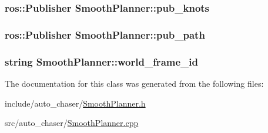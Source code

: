\subsubsection[{\texorpdfstring{pub\+\_\+knots}{pub_knots}}]{\setlength{\rightskip}{0pt plus 5cm}ros\+::\+Publisher Smooth\+Planner\+::pub\+\_\+knots}\hypertarget{class_smooth_planner_a7ee67bceac6d60409542a2250b2ccd08}{}\label{class_smooth_planner_a7ee67bceac6d60409542a2250b2ccd08}
\subsubsection[{\texorpdfstring{pub\+\_\+path}{pub_path}}]{\setlength{\rightskip}{0pt plus 5cm}ros\+::\+Publisher Smooth\+Planner\+::pub\+\_\+path}\hypertarget{class_smooth_planner_a7b8400f711456291e567d0fc204c274b}{}\label{class_smooth_planner_a7b8400f711456291e567d0fc204c274b}
\subsubsection[{\texorpdfstring{world\+\_\+frame\+\_\+id}{world_frame_id}}]{\setlength{\rightskip}{0pt plus 5cm}string Smooth\+Planner\+::world\+\_\+frame\+\_\+id}\hypertarget{class_smooth_planner_ade278c4209b962d8342a2ee30e718c8b}{}\label{class_smooth_planner_ade278c4209b962d8342a2ee30e718c8b}


The documentation for this class was generated from the following files\+:\begin{DoxyCompactItemize}
\item 
include/auto\+\_\+chaser/\hyperlink{_smooth_planner_8h}{Smooth\+Planner.\+h}\item 
src/auto\+\_\+chaser/\hyperlink{_smooth_planner_8cpp}{Smooth\+Planner.\+cpp}\end{DoxyCompactItemize}
